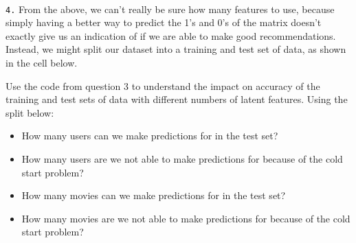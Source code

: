\documentclass[11pt]{article}
\providecommand{\tightlist}{%
      \setlength{\itemsep}{0pt}\setlength{\parskip}{0pt}}
\begin{document}
    \begin{center}
    \end{center}
    { \hspace*{\fill} \\}
    
    \texttt{4.} From the above, we can't really be sure how many features to
use, because simply having a better way to predict the 1's and 0's of
the matrix doesn't exactly give us an indication of if we are able to
make good recommendations. Instead, we might split our dataset into a
training and test set of data, as shown in the cell below.

Use the code from question 3 to understand the impact on accuracy of the
training and test sets of data with different numbers of latent
features. Using the split below:

\begin{itemize}
\tightlist
\item
  How many users can we make predictions for in the test set?\\
\item
  How many users are we not able to make predictions for because of the
  cold start problem?
\item
  How many movies can we make predictions for in the test set?\\
\item
  How many movies are we not able to make predictions for because of the
  cold start problem?
\end{itemize}
\end{document}
